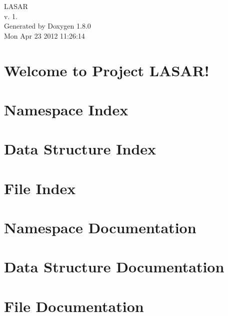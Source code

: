 \documentclass{book}
\begin{document}
\hypersetup{pageanchor=false,citecolor=blue}
\begin{titlepage}
\vspace*{7cm}
\begin{center}
{\Large L\-A\-S\-A\-R \\[1ex]\large v. 1. }\\
\vspace*{1cm}
{\large Generated by Doxygen 1.8.0}\\
\vspace*{0.5cm}
{\small Mon Apr 23 2012 11:26:14}\\
\end{center}
\end{titlepage}
\clearemptydoublepage
{}
\tableofcontents
\clearemptydoublepage
{}
\hypersetup{pageanchor=true,citecolor=blue}
\chapter{Welcome to Project L\-A\-S\-A\-R!}
\label{index}\hypertarget{index}{}
\chapter{Namespace Index}

\chapter{Data Structure Index}

\chapter{File Index}

\chapter{Namespace Documentation}




\chapter{Data Structure Documentation}






\chapter{File Documentation}






\printindex
\end{document}
